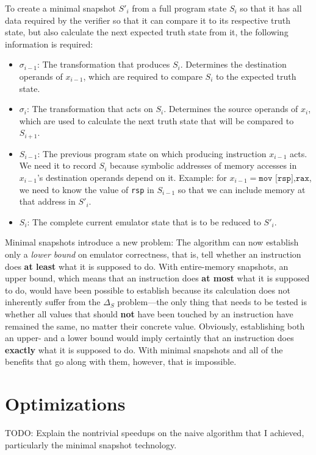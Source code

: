 To create a minimal snapshot $S'_i$ from a full program state $S_i$ so that it has all data required by the verifier so
that it can compare it to its respective truth state, but also calculate the next expected truth state from it, the
following information is required:

\begin{itemize}
    \item $\sigma_{i-1}$: The transformation that produces $S_i$. Determines the destination operands of $x_{i-1}$,
        which are required to compare $S_i$ to the expected truth state.
    \item $\sigma_i$: The transformation that acts on $S_i$. Determines the source operands of $x_i$, which are used to
        calculate the next truth state that will be compared to $S_{i+1}$.
    \item $S_{i-1}$: The previous program state on which producing instruction $x_{i-1}$ acts. We need it to record
        $S_i$ because symbolic addresses of memory accesses in $x_{i-1}$'s destination operands depend on it. Example:
        for $x_{i-1} = \texttt{mov [rsp],rax}$, we need to know the value of \texttt{rsp} in $S_{i-1}$ so that we can
        include memory at that address in $S'_i$.
    \item $S_i$: The complete current emulator state that is to be reduced to $S'_i$.
\end{itemize}

Minimal snapshots introduce a new problem: The algorithm can now establish only a \textit{lower bound} on emulator
correctness, that is, tell whether an instruction does \textbf{at least} what it is supposed to do. With entire-memory
snapshots, an upper bound, which means that an instruction does \textbf{at most} what it is supposed to do, would have
been possible to establish because its calculation does not inherently suffer from the $\Delta_S$ problem---the only
thing that needs to be tested is whether all values that should \textbf{not} have been touched by an instruction have
remained the same, no matter their concrete value. Obviously, establishing both an upper- and a lower bound would imply
certaintly that an instruction does \textbf{exactly} what it is supposed to do. With minimal snapshots and all of the
benefits that go along with them, however, that is impossible.

\section{Optimizations}

TODO: Explain the nontrivial speedups on the naive algorithm that I achieved, particularly the minimal snapshot
technology.



%
%
%
